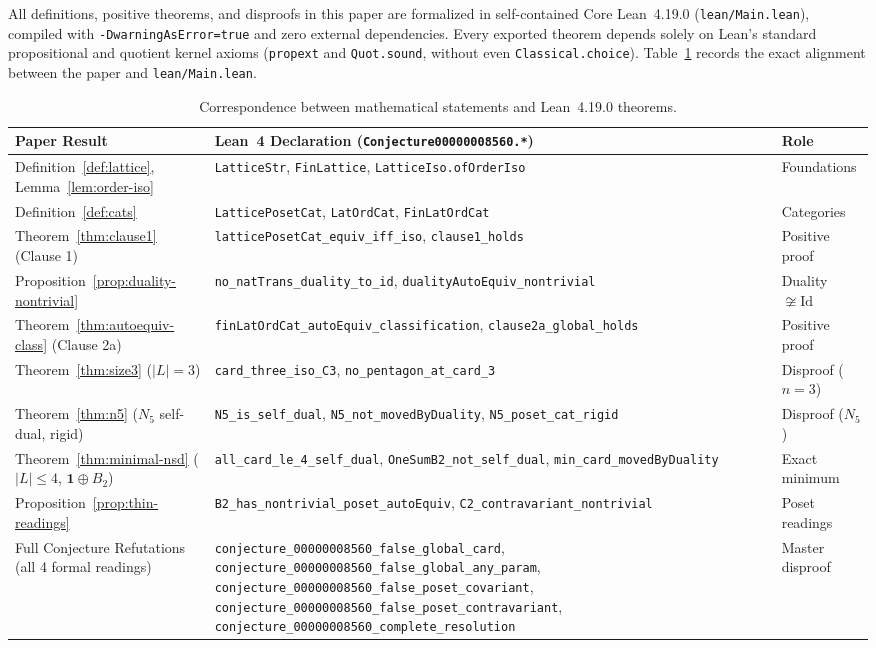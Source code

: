\documentclass[11pt]{article}
\theoremstyle{definition}
\newcommand{\Id}{\mathrm{Id}}
\begin{document}
All definitions, positive theorems, and disproofs in this paper are formalized in
self-contained Core Lean~4.19.0 (\texttt{lean/Main.lean}), compiled with
\texttt{-DwarningAsError=true} and zero external dependencies. Every exported
theorem depends solely on Lean's standard propositional and quotient kernel
axioms (\texttt{propext} and \texttt{Quot.sound}, without even
\texttt{Classical.choice}). Table~\ref{tab:lean-map} records the exact alignment
between the paper and \texttt{lean/Main.lean}.

\begin{table}[ht]
\centering
\footnotesize
\renewcommand{\arraystretch}{1.22}
\begin{tabular}{@{}>{\raggedright\arraybackslash}p{3.8cm}>{\raggedright\arraybackslash}p{9.1cm}l@{}}
\toprule
\textbf{Paper Result} & \textbf{Lean~4 Declaration (\texttt{Conjecture00000008560.*})} & \textbf{Role} \\
\midrule
Definition~\ref{def:lattice}, Lemma~\ref{lem:order-iso} &
\texttt{LatticeStr}, \texttt{FinLattice}, \texttt{LatticeIso.ofOrderIso} & Foundations \\
Definition~\ref{def:cats} &
\texttt{LatticePosetCat}, \texttt{LatOrdCat}, \texttt{FinLatOrdCat} & Categories \\
Theorem~\ref{thm:clause1} (Clause 1) &
\texttt{latticePosetCat\_equiv\_iff\_iso}, \texttt{clause1\_holds} & Positive proof \\
Proposition~\ref{prop:duality-nontrivial} &
\texttt{no\_natTrans\_duality\_to\_id}, \texttt{dualityAutoEquiv\_nontrivial} & Duality $\not\cong \Id$ \\
Theorem~\ref{thm:autoequiv-class} (Clause 2a) &
\texttt{finLatOrdCat\_autoEquiv\_classification}, \texttt{clause2a\_global\_holds} & Positive proof \\
Theorem~\ref{thm:size3} ($|L| = 3$) &
\texttt{card\_three\_iso\_C3}, \texttt{no\_pentagon\_at\_card\_3} & Disproof ($n=3$) \\
Theorem~\ref{thm:n5} ($N_5$ self-dual, rigid) &
\texttt{N5\_is\_self\_dual}, \texttt{N5\_not\_movedByDuality}, \texttt{N5\_poset\_cat\_rigid} & Disproof ($N_5$) \\
Theorem~\ref{thm:minimal-nsd} ($|L| \le 4$, $\mathbf{1}\oplus B_2$) &
\texttt{all\_card\_le\_4\_self\_dual}, \texttt{OneSumB2\_not\_self\_dual}, \texttt{min\_card\_movedByDuality} & Exact minimum \\
Proposition~\ref{prop:thin-readings} &
\texttt{B2\_has\_nontrivial\_poset\_autoEquiv}, \texttt{C2\_contravariant\_nontrivial} & Poset readings \\
Full Conjecture Refutations (all 4 formal readings) &
\texttt{conjecture\_00000008560\_false\_global\_card}, \texttt{conjecture\_00000008560\_false\_global\_any\_param}, \texttt{conjecture\_00000008560\_false\_poset\_covariant}, \texttt{conjecture\_00000008560\_false\_poset\_contravariant}, \texttt{conjecture\_00000008560\_complete\_resolution} & Master disproof \\
\bottomrule
\end{tabular}
\caption{Correspondence between mathematical statements and Lean~4.19.0 theorems.}
\label{tab:lean-map}
\end{table}
\end{document}
